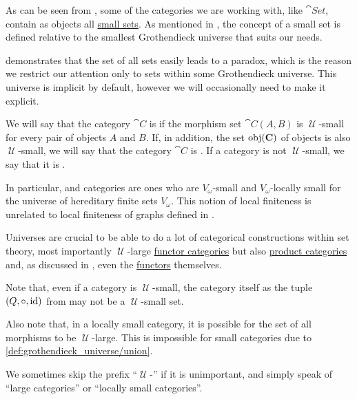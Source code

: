 \begin{definition}\label{def:category_size}
  As can be seen from , some of the categories we are working with, like \( \cat{Set} \), contain as objects all \hyperref[def:large_and_small_sets]{small sets}. As mentioned in , the concept of a small set is defined relative to the smallest Grothendieck universe that suits our needs.

   demonstrates that the set of all sets easily leads to a paradox, which is the reason we restrict our attention only to sets within some Grothendieck universe. This universe is implicit by default, however we will occasionally need to make it explicit.

  We will say that the category \( \cat{C} \) is  if the morphism set \( \cat{C}(A, B) \) is \( \mscrU \)-small for every pair of objects \( A \) and \( B \). If, in addition, the set \( \operatorname{obj}(\operatorname{\mathbf{C}}) \) of objects is also \( \mscrU \)-small, we will say that the category \( \cat{C} \) is . If a category is not \( \mscrU \)-small, we say that it is .

  In particular,  and  categories are ones who are \( V_\omega \)-small and \( V_\omega \)-locally small for the universe of hereditary finite sets \hyperref[def:universe_of_hereditary_finite_sets]{\( V_\omega \)}. This notion of local finiteness is unrelated to local finiteness of graphs defined in .

  Universes are crucial to be able to do a lot of categorical constructions within set theory, most importantly \( \mscrU \)-large \hyperref[def:functor_category]{functor categories} but also \hyperref[def:product_category]{product categories} and, as discussed in , even the \hyperref[def:functor]{functors} themselves.

  Note that, even if a category is \( \mscrU \)-small, the category itself as the tuple \( (Q, \bincirc, \id) \) from  may not be a \( \mscrU \)-small set.

  Also note that, in a locally small category, it is possible for the set of all morphisms to be \( \mscrU \)-large. This is impossible for small categories due to \ref{def:grothendieck_universe/union}.

  We sometimes skip the prefix \enquote{\( \mscrU \)-} if it is unimportant, and simply speak of \enquote{large categories} or \enquote{locally small categories}.
\end{definition}

